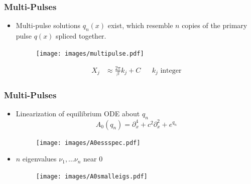 \documentclass[16pt]{beamer}
\begin{document}
\begin{frame}
\frametitle{Multi-Pulses}   
    \begin{theorem}
    \begin{itemize}
    \item Multi-pulse solutions $q_n(x)$ exist, which resemble $n$ copies of the primary pulse $q(x)$ spliced together.

	\begin{figure}
	\begin{center}
	\texttt{[image: images/multipulse.pdf]}
	\end{center}
	\end{figure}
	\begin{align*}
	 X_j &\approx \frac{2 \pi}{\beta} k_j + C && k_j \text{ integer}
	\end{align*}
	\end{itemize}
    \end{theorem}
\end{frame}

\begin{frame}
\frametitle{Multi-Pulses}   
    \begin{theorem}[Sandstede, 1997]
    \begin{itemize}
    	\item Linearization of equilibrium ODE about $q_n$ 
    	\[
    	A_0(q_n) = \partial_x^4 + c^2 \partial_x^2 + e^{q_n} 
    	\]
    	\begin{figure}
		\begin{center}
		\texttt{[image: images/A0essspec.pdf]}
		\end{center}
		\end{figure}

    	\item $n$ eigenvalues $\nu_1, \dots \nu_n$ near 0

        \begin{figure}
		\begin{center}
		\texttt{[image: images/A0smalleigs.pdf]}
		\end{center}
		\end{figure}
    \end{itemize}
    \end{theorem}
\end{frame}
\end{document}
